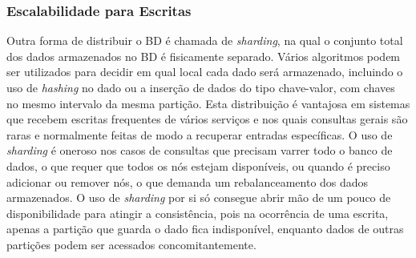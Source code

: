 \subsubsection{\textbf{Escalabilidade para Escritas}}
Outra forma de distribuir o BD é chamada de \textit{sharding}, na qual o conjunto total dos dados armazenados no BD é fisicamente separado. Vários algoritmos podem ser utilizados para decidir em qual local cada dado será armazenado, incluindo o uso de \textit{hashing} no dado ou a inserção de dados do tipo chave-valor, com chaves no mesmo intervalo da mesma partição.
Esta distribuição é vantajosa em sistemas que recebem escritas frequentes de vários serviços e nos quais consultas gerais são raras e normalmente feitas de modo a recuperar entradas específicas. O uso de \textit{sharding} é oneroso nos casos de consultas que precisam varrer todo o banco de dados, o que requer que todos os nós estejam disponíveis, ou quando é preciso adicionar ou remover nós, o que demanda um rebalanceamento dos dados armazenados. O uso de \textit{sharding} por si só consegue abrir mão de um pouco de disponibilidade para atingir a consistência, pois na ocorrência de uma escrita, apenas a partição que guarda o dado fica indisponível, enquanto dados de outras partições podem ser acessados concomitantemente.












